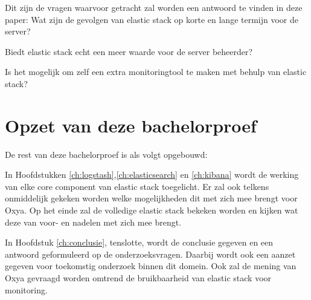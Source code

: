 Dit zijn de vragen waarvoor getracht zal worden een antwoord te vinden in deze paper:
Wat zijn de gevolgen van elastic stack op korte en lange termijn voor de server?

Biedt elastic stack echt een meer waarde voor de server beheerder?

Is het mogelijk om zelf een extra monitoringtool te maken met behulp van elastic stack?

\section{Opzet van deze bachelorproef}
\label{sec:opzet-bachelorproef}


De rest van deze bachelorproef is als volgt opgebouwd:

In Hoofdstukken \hyperref[ch:logstash]{\ref{ch:logstash}},\hyperref[ch:elasticsearch]{\ref{ch:elasticsearch}} en \hyperref[ch:kibana]{\ref{ch:kibana}} wordt de werking van elke core component van elastic stack toegelicht. Er zal ook telkens onmiddelijk gekeken worden welke mogelijkheden dit met zich mee brengt voor Oxya. Op het einde zal de volledige elastic stack bekeken worden en kijken wat deze van voor- en nadelen met zich mee brengt.


In Hoofdstuk \hyperref[ch:logstash]{\ref{ch:conclusie}}, tenslotte, wordt de conclusie gegeven en een antwoord geformuleerd op de onderzoeksvragen. Daarbij wordt ook een aanzet gegeven voor toekomstig onderzoek binnen dit domein. Ook zal de mening van Oxya gevraagd worden omtrend de bruikbaarheid van elastic stack voor monitoring. 
